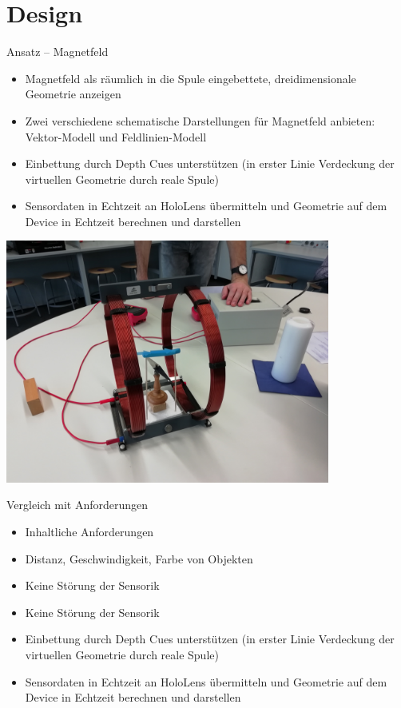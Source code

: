 \part{Design}
\label{part:design}

\begin{frame}[fragile]{Ansatz -- Magnetfeld}
\begin{itemize}
\item Magnetfeld als räumlich in die Spule eingebettete, dreidimensionale Geometrie anzeigen
\item Zwei verschiedene schematische Darstellungen für Magnetfeld anbieten: Vektor-Modell und Feldlinien-Modell
\item Einbettung durch Depth Cues unterstützen (in erster Linie Verdeckung der virtuellen Geometrie durch reale Spule)
\item Sensordaten in Echtzeit an HoloLens übermitteln und Geometrie auf dem Device in Echtzeit berechnen und darstellen
\end{itemize}
\end{frame}

\begin{frame}
\vspace{-1em}
\begin{center}
\includegraphics[width=0.8\textwidth]{images/Design_Magnetfeld.jpg}	
\end{center}
\end{frame}

\begin{frame}[fragile]{Vergleich mit Anforderungen}
\begin{itemize}
\item Inhaltliche Anforderungen
\item Distanz, Geschwindigkeit, Farbe von Objekten
\item Keine Störung der Sensorik
\item Keine Störung der Sensorik	

\item Einbettung durch Depth Cues unterstützen (in erster Linie Verdeckung der virtuellen Geometrie durch reale Spule)
\item Sensordaten in Echtzeit an HoloLens übermitteln und Geometrie auf dem Device in Echtzeit berechnen und darstellen
\end{itemize}
\end{frame}

